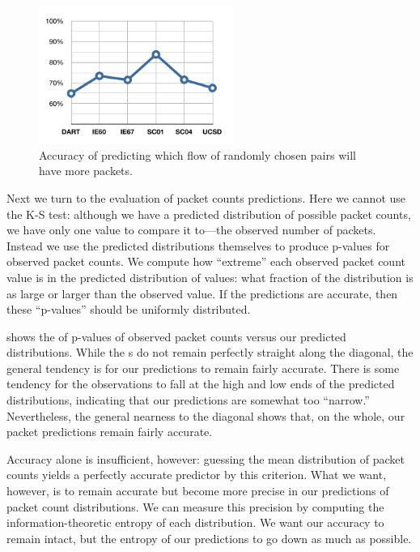 \documentclass{acm_proc_article-sp}
\begin{document}
\begin{figure}[t]
\vspace{-0.9em}
\begin{center}
\includegraphics[width=2.5in]{pred_stats_count}
\vspace{-0.5em}
\caption{Accuracy of predicting which flow of randomly chosen pairs will have more packets.}
\end{center}
\vspace{-2em}
\end{figure}

Next we turn to the evaluation of packet counts predictions.
Here we cannot use the K-S test:
although we have a predicted distribution of possible packet counts, we have only one value to compare it to---the observed number of packets.
Instead we use the predicted distributions themselves to produce p-values for observed packet counts.
We compute how ``extreme'' each observed packet count value is in the predicted distribution of values:
what fraction of the distribution is as large or larger than the observed value.
If the predictions are accurate, then these ``p-values'' should be uniformly distributed.

 shows the  of p-values of observed packet counts versus our predicted distributions.
While the s do not remain perfectly straight along the diagonal, the general tendency is for our predictions to remain fairly accurate.
There is some tendency for the observations to fall at the high and low ends of the predicted distributions, indicating that our predictions are somewhat too ``narrow.''
Nevertheless, the general nearness to the diagonal shows that, on the whole, our packet predictions remain fairly accurate.

Accuracy alone is insufficient, however:
guessing the mean distribution of packet counts yields a perfectly accurate predictor by this criterion.
What we want, however, is to remain accurate but become more precise in our predictions of packet count distributions.
We can measure this precision by computing the information-theoretic entropy of each distribution.
We want our accuracy to remain intact, but the entropy of our predictions to go down as much as possible.
\end{document}
